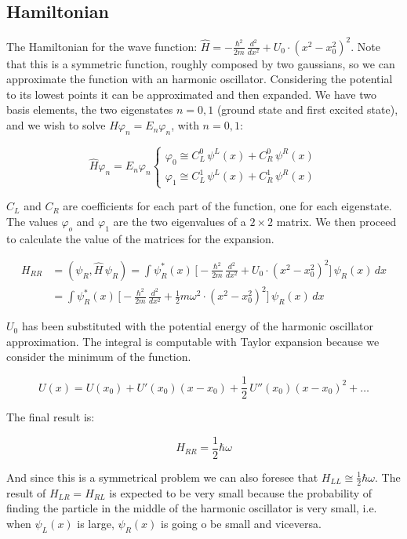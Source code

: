 	\subsection{Hamiltonian}
The Hamiltonian for the wave function: $\hat{H}=-\frac{\hbar^2}{2m}\,\frac{d^2}{dx^2}+U_0\cdot(x^2-x_0^2)^2$.
Note that this is a symmetric function, roughly composed by two gaussians, so we can approximate the function with an harmonic oscillator.
Considering the potential to its lowest points it can be approximated and then expanded.
We have two basis elements, the two eigenstates $n=0,1$ (ground state and first excited state), and we wish to solve $\hat{H}\varphi_n=E_n\varphi_n$, with $n=0,1$:

$$\hat{H}\varphi_n=E_n\varphi_n\begin{cases}\varphi_0 \cong C_L^0\,\psi^L(x)+C_R^0\,\psi^R(x)\\\varphi_1 \cong C_L^1\,\psi^L(x)+C_R^1\,\psi^R(x)\end{cases}$$

$C_L$ and $C_R$ are coefficients for each part of the function, one for each eigenstate.
The values $\varphi_o$ and $\varphi_1$ are the two eigenvalues of a $2 \times 2 $ matrix.
We then proceed to calculate the value of the matrices for the expansion.

\begin{align*}H_{RR}&=(\psi_R,\hat{H}\,\psi_R)= \int\psi_R^*(x)\,\bigg[-\frac{\hbar^2}{2m}\,\frac{d^2}{dx^2}+U_0\cdot(x^2-x_0^2)^2\bigg]\,\psi_R(x)\,dx\\
&=\int\psi_R^*(x)\,\bigg[-\frac{\hbar^2}{2m}\,\frac{d^2}{dx^2}+\frac{1}{2}m\omega^2\cdot(x^2-x_0^2)^2\bigg]\,\psi_R(x)\,dx
\end{align*}

$U_0$ has been substituted with the potential energy of the harmonic oscillator approximation.
The integral is computable with Taylor expansion because we consider the minimum of the function.

$$U(x)=U(x_0)+U'(x_0)(x-x_0)+\frac{1}{2}\,U''(x_0)(x-x_0)^2+\dots$$

The final result is:

$$H_{RR}=\frac{1}{2}\hbar\omega$$

And since this is a symmetrical problem we can also foresee that $H_{LL}\cong\frac{1}{2}\hbar\omega$.
The result of $H_{LR}=H_{RL}$ is expected to be very small because the probability of finding the particle in the middle of the harmonic oscillator is very small, i.e. when $\psi_L(x)$ is large, $\psi_R(x)$ is going o be small and viceversa.

